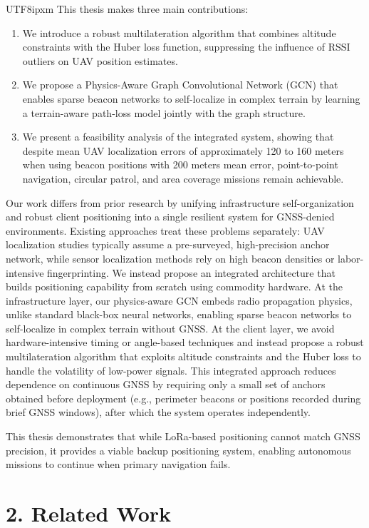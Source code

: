 \documentclass[a4paper,10pt,twocolumn]{article}
\begin{document}
\begin{CJK}{UTF8}{ipxm}
This thesis makes three main contributions:
\begin{enumerate}
    \item We introduce a robust multilateration algorithm that combines altitude constraints with the Huber loss function, suppressing the influence of RSSI outliers on UAV position estimates.
    \item We propose a Physics-Aware Graph Convolutional Network (GCN) that enables sparse beacon networks to self-localize in complex terrain by learning a terrain-aware path-loss model jointly with the graph structure.
    \item We present a feasibility analysis of the integrated system, showing that despite mean UAV localization errors of approximately 120 to 160 meters when using beacon positions with 200 meters mean error, point-to-point navigation, circular patrol, and area coverage missions remain achievable.
\end{enumerate}
Our work differs from prior research by unifying infrastructure self-organization and robust client positioning into a single resilient system for GNSS-denied environments.
Existing approaches treat these problems separately: UAV localization studies typically assume a pre-surveyed, high-precision anchor network, while sensor localization methods rely on high beacon densities or labor-intensive fingerprinting.
We instead propose an integrated architecture that builds positioning capability from scratch using commodity hardware.
At the infrastructure layer, our physics-aware GCN embeds radio propagation physics, unlike standard black-box neural networks, enabling sparse beacon networks to self-localize in complex terrain without GNSS.
At the client layer, we avoid hardware-intensive timing or angle-based techniques and instead propose a robust multilateration algorithm that exploits altitude constraints and the Huber loss to handle the volatility of low-power signals.
This integrated approach reduces dependence on continuous GNSS by requiring only a small set of anchors obtained before deployment (e.g., perimeter beacons or positions recorded during brief GNSS windows), after which the system operates independently.

This thesis demonstrates that while LoRa-based positioning cannot match GNSS precision, it provides a viable backup positioning system, enabling autonomous missions to continue when primary navigation fails.

\section*{2. Related Work}


\end{CJK}
\end{document}
